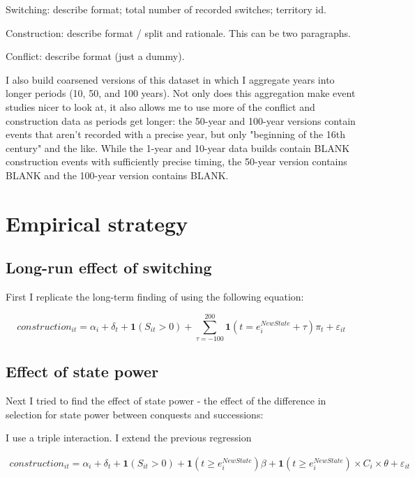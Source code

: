 \documentclass{article}
\begin{document}
Switching: describe format; total number of recorded switches; territory id.

Construction: describe format / split and rationale. This can be two paragraphs.

Conflict: describe format (just a dummy).


I also build coarsened versions of this dataset in which I aggregate years into longer periods (10, 50, and 100 years). Not only does this aggregation make event studies nicer to look at, it also allows me to use more of the conflict and construction data as periods get longer: the 50-year and 100-year versions contain events that aren't recorded with a precise year, but only "beginning of the 16th century" and the like. While the 1-year and 10-year data builds contain BLANK construction events with sufficiently precise timing, the 50-year version contains BLANK and the 100-year version contains BLANK.



\section{Empirical strategy}

\subsection{Long-run effect of switching}

First I replicate the long-term finding of \cite{schoenholzer2022} using the following equation:

\begin{equation}
    construction_{it} = \alpha_i + \delta_t + \mathbf{1}(S_{it} > 0) + 
    \sum_{\tau = -100}^{200} \mathbf{1}(t = e^{NewState}_i + \tau)\pi_t + \varepsilon_{it}
\end{equation}


\subsection{Effect of state power}


Next I tried to find the effect of state power - the effect of the difference in selection for state power between conquests and successions:

I use a triple interaction. I extend the previous regression

\begin{multline}
    construction_{it} = \alpha_i + \delta_t + \mathbf{1}(S_{it} > 0) +
    \mathbf{1}(t \ge e^{NewState}_i)\beta +
    \mathbf{1}(t \ge e^{NewState}_i) \times C_i \times \theta + \varepsilon_{it}
\end{multline}
\end{document}
